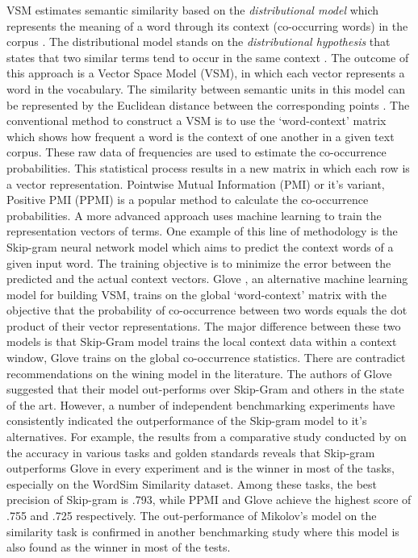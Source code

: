 \documentclass[Journal, BackFigs, DoubleSpace]{ascelike}%
\begin{document}
VSM estimates semantic similarity based on the \textit{distributional model} which represents the meaning of a word through its context (co-occurring words) in the corpus \cite{erk12}. The distributional model stands on the \textit{distributional hypothesis} that states that two similar terms tend to occur in the same context \cite{Harris54}. The outcome of this approach is a Vector Space Model (VSM), in which each vector represents a word in the vocabulary. The similarity between semantic units in this model can be represented by the Euclidean distance between the corresponding points \cite{erk12}. The conventional method to construct a VSM is to use the `word-context' matrix which shows how frequent a word is the context of one another in a given text corpus. These raw data of frequencies are used to estimate the co-occurrence probabilities. This statistical process results in a new matrix in which each row is a vector representation. Pointwise Mutual Information (PMI) \cite{church90} or it's variant, Positive PMI (PPMI) is a popular method to calculate the co-occurrence probabilities. A more advanced approach uses machine learning to train the representation vectors of terms. One example of this line of methodology is the Skip-gram neural network model \cite{mikolov13a} which aims to predict the context words of a given input word. The training objective is to minimize the error between the predicted and the actual context vectors. Glove \cite{pennington2014glove}, an alternative machine learning model for building VSM, trains on the global `word-context' matrix with the objective that the probability of co-occurrence between two words equals the dot product of their vector representations. The major difference between these two models is that Skip-Gram model trains the local context data within a context window, Glove trains on the global co-occurrence statistics. There are contradict recommendations on the wining model in the literature. The authors of Glove suggested that their model out-performs over Skip-Gram and others in the state of the art. However, a number of independent benchmarking experiments have consistently indicated the outperformance of the Skip-gram model to it's alternatives. For example, the results from a comparative study conducted by  on the accuracy in various tasks and golden standards reveals that Skip-gram outperforms Glove in every experiment and is the winner in most of the tasks, especially on the WordSim Similarity dataset. Among these tasks, the best precision of Skip-gram is .793, while PPMI and Glove achieve the highest score of .755 and .725 respectively.  The out-performance of Mikolov's model on the similarity task is confirmed in another benchmarking study \cite{hill15} where this model is also found as the winner in most of the tests. 
\end{document}

